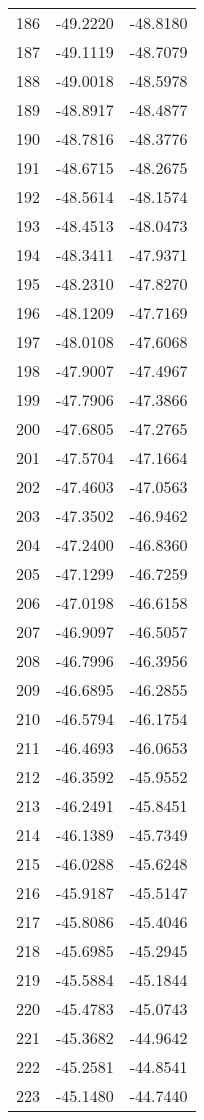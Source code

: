 \documentclass{article}
\begin{document}
\begin{longtable}{|c|c|c|}
186 & -49.2220 & -48.8180 \\
187 & -49.1119 & -48.7079 \\
188 & -49.0018 & -48.5978 \\
189 & -48.8917 & -48.4877 \\
190 & -48.7816 & -48.3776 \\
191 & -48.6715 & -48.2675 \\
192 & -48.5614 & -48.1574 \\
193 & -48.4513 & -48.0473 \\
194 & -48.3411 & -47.9371 \\
195 & -48.2310 & -47.8270 \\
196 & -48.1209 & -47.7169 \\
197 & -48.0108 & -47.6068 \\
198 & -47.9007 & -47.4967 \\
199 & -47.7906 & -47.3866 \\
200 & -47.6805 & -47.2765 \\
201 & -47.5704 & -47.1664 \\
202 & -47.4603 & -47.0563 \\
203 & -47.3502 & -46.9462 \\
204 & -47.2400 & -46.8360 \\
205 & -47.1299 & -46.7259 \\
206 & -47.0198 & -46.6158 \\
207 & -46.9097 & -46.5057 \\
208 & -46.7996 & -46.3956 \\
209 & -46.6895 & -46.2855 \\
210 & -46.5794 & -46.1754 \\
211 & -46.4693 & -46.0653 \\
212 & -46.3592 & -45.9552 \\
213 & -46.2491 & -45.8451 \\
214 & -46.1389 & -45.7349 \\
215 & -46.0288 & -45.6248 \\
216 & -45.9187 & -45.5147 \\
217 & -45.8086 & -45.4046 \\
218 & -45.6985 & -45.2945 \\
219 & -45.5884 & -45.1844 \\
220 & -45.4783 & -45.0743 \\
221 & -45.3682 & -44.9642 \\
222 & -45.2581 & -44.8541 \\
223 & -45.1480 & -44.7440 \\

\end{longtable}
\end{document}
